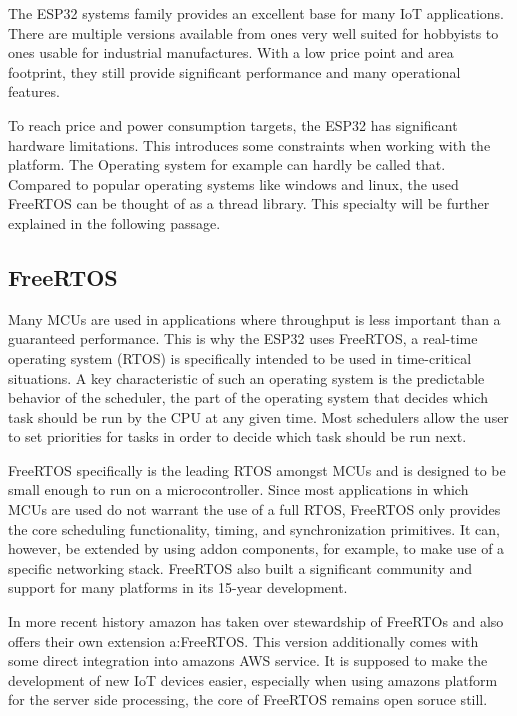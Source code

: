 The ESP32 systems family provides an excellent base for many IoT applications. There are multiple versions available from ones very well suited for hobbyists to ones usable for industrial manufactures. With a low price point and area footprint, they still provide significant performance and many operational features\autocite{maier_comparative_2017}.

To reach price and power consumption targets, the ESP32 has significant hardware limitations. This introduces some constraints when working with the platform. The Operating system for example can hardly be called that. Compared to popular operating systems like windows and linux, the used FreeRTOS can be thought of as a thread library. This specialty will be further explained in the following passage.
\subsection{FreeRTOS}
Many MCUs are used in applications where throughput is less important than a guaranteed performance. This is why the ESP32 uses FreeRTOS, a real-time operating system (RTOS) is specifically intended to be used in time-critical situations. A key characteristic of such an operating system is the predictable behavior of the scheduler, the part of the operating system that decides which task should be run by the CPU at any given time. Most schedulers allow the user to set priorities for tasks in order to decide which task should be run next.

FreeRTOS specifically is the leading RTOS amongst MCUs and is designed to be small enough to run on a microcontroller\autocite{noauthor_freertos_nodate}. Since most applications in which MCUs are used do not warrant the use of a full RTOS, FreeRTOS only provides the core scheduling functionality, timing, and synchronization primitives. It can, however, be extended by using addon components, for example, to make use of a specific networking stack. FreeRTOS also built a significant community and support for many platforms in its 15-year development.

In more recent history amazon has taken over stewardship of FreeRTOs and also offers their own extension a:FreeRTOS\autocite{lardinois_amazon_nodate}. This version additionally comes with some direct integration into amazons AWS service\autocite{noauthor_freertos_nodate-1}. It is supposed to make the development of new IoT devices easier, especially when using amazons platform for the server side processing, the core of FreeRTOS remains open soruce still.
